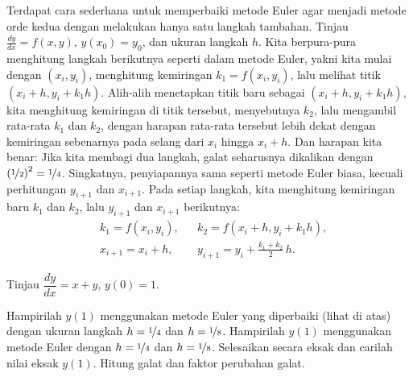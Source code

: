 Terdapat cara sederhana untuk memperbaiki metode Euler agar menjadi
metode orde kedua dengan melakukan hanya satu langkah tambahan.
Tinjau $\frac{dy}{dx}=f(x,y)$, $y(x_0) = y_0$,
dan ukuran langkah $h$.
Kita berpura-pura menghitung langkah berikutnya seperti dalam metode Euler,
yakni kita mulai dengan $(x_i,y_i)$, menghitung
kemiringan $k_1 = f(x_i,y_i)$, lalu melihat titik $(x_i+h,y_i + k_1h)$.
Alih-alih menetapkan titik baru sebagai $(x_i+h,y_i + k_1h)$, kita menghitung
kemiringan di titik tersebut, menyebutnya $k_2$, lalu mengambil rata-rata
$k_1$ dan $k_2$, dengan harapan rata-rata tersebut lebih dekat dengan
kemiringan sebenarnya pada selang dari $x_i$ hingga $x_i+h$.  Dan harapan kita benar:
Jika kita membagi dua langkah, galat seharusnya dikalikan dengan
${(\nicefrac{1}{2})}^2 = \nicefrac{1}{4}$.
Singkatnya, penyiapannya
sama seperti metode Euler biasa, kecuali
perhitungan $y_{i+1}$ dan $x_{i+1}$.
Pada setiap langkah, kita menghitung kemiringan baru $k_1$ dan $k_2$, lalu
$y_{i+1}$ dan $x_{i+1}$ berikutnya:
\begin{align*}
& k_1 = f(x_i,y_i) ,
&
& k_2 = f(x_i + h,y_i + k_1h) ,
\\
& x_{i+1} = x_i + h ,
&
& y_{i+1} = y_i + \frac{k_1+k_2}{2}\,h .
\end{align*}


\begin{exercise}
Tinjau $\dfrac{dy}{dx} = x+y$, $y(0)=1$.
\begin{tasks}
\task Hampirilah $y(1)$ menggunakan metode Euler yang diperbaiki (lihat di atas) dengan
ukuran langkah $h=\nicefrac{1}{4}$ dan $h=\nicefrac{1}{8}$.
\task Hampirilah $y(1)$ menggunakan metode Euler dengan
$h=\nicefrac{1}{4}$ dan $h=\nicefrac{1}{8}$.
\task Selesaikan secara eksak dan carilah nilai eksak
$y(1)$.
\task Hitung galat dan faktor perubahan galat.
\end{tasks}
\end{exercise}


